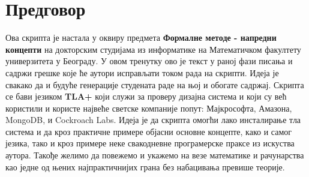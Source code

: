 \section*{Предговор}
Ова скрипта је настала у оквиру предмета \textbf{Формалне методе - напредни концепти} на докторским студијама
из информатике на Математичком факултету универзитета у Београду. У овом тренутку ово је текст у раној
фази писања и садржи грешке које ће аутори исправљати током рада на скрипти. Идеја је свакако
да и будуће генерације студената раде на њој и обогате садржај. Скрипта се бави језиком \textbf{TLA+}
који служи за проверу дизајна система и који су већ користили и користе највеће светске компаније попут:
Мајкрософта, Амазона, MongoDB, и Cockroach Labs. Идеја је да скрипта омогћи лако
инсталирање тла система и да кроз практичне примере објасни основне концепте, како и самог језика, тако
и кроз примере неке свакодневне програмерске праксе из искуства аутора. Такође желимо да повежемо
и укажемо на везе математике и рачунарства као једне од њених најпрактичнијих грана без набацивања
превише теорије.
\newpage
